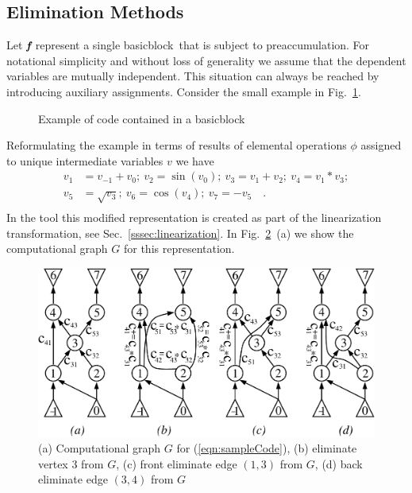 \documentclass[11pt]{article}
\newcommand{\basicblock}{basicblock}
\newcommand{\bmf}{\mbox{\bf\em f}}
\newcommand{\refsec}[1]{{Sec.~\ref{#1}}}
\newcommand{\reffig}[1]{{Fig.~\ref{#1}}}
\newcommand{\refeqn}[1]{{(\ref{#1})}}
\begin{document}
\subsection{Elimination Methods} \label{ssec:elimMeth}
Let $\bmf$ represent a single \basicblock\ that is subject to preaccumulation.
For notational simplicity and without loss of generality we assume that the 
dependent variables are mutually independent. 
This situation can always be
reached by introducing auxiliary assignments.
Consider the small example in \reffig{fig:toyBB}.
\begin{figure}[h]
  \begin{center}
    \begin{minipage}{.4\textwidth}
    \end{minipage}
  \end{center}
  \caption{Example of code contained in a \basicblock}\label{fig:toyBB}
\end{figure}
Reformulating the example in terms of 
results of elemental operations $\phi$ assigned to unique intermediate 
variables $v$ we have 
\begin{equation}\label{eqn:sampleCode}
  \begin{split}
    v_1&=v_{-1}+v_0;~v_2=\sin(v_0);~v_3=v_1+v_2;~v_4=v_1*v_3; \\
    v_5&=\sqrt{v_3};~v_6=\cos(v_4);~v_7=-v_5 \quad .\\
  \end{split}
\end{equation}
In the tool this modified representation is created as part of the linearization transformation, see 
\refsec{sssec:linearization}.
In \reffig{fig:elims}~(a) we show the computational graph $G$ for this representation.
\begin{figure}
  \centering\includegraphics[width=.7\textwidth]{elims}
  \caption{
    (a) Computational graph $G$ for \refeqn{eqn:sampleCode}, 
    (b) eliminate vertex 3 from $G$, 
    (c) front eliminate edge $(1,3)$ from $G$, 
    (d) back eliminate edge $(3,4)$ from $G$} 
  \label{fig:elims}
\end{figure}
\end{document}
